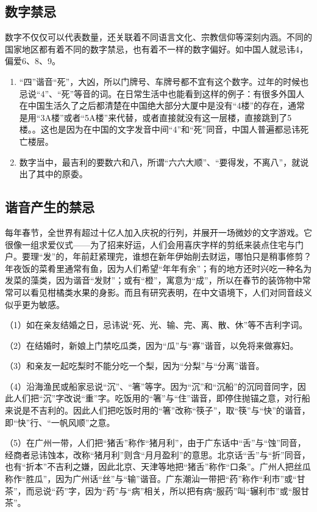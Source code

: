 \subsection{数字禁忌}

    数字不仅仅可以代表数量，还关联着不同语言文化、宗教信仰等深刻内涵。不同的国家地区都有着不同的数字禁忌，也有着不一样的数字偏好。如中国人就忌讳4，偏爱6、8、9。
    \begin{enumerate}
    \item 
    “四”谐音“死”，大凶，所以门牌号、车牌号都不宜有这个数字。过年的时候也忌说“4”、“死”等音的词。在日常生活中也能看到这样的例子：有很多外国人在中国生活久了之后都清楚在中国绝大部分大厦中是没有“4楼”的存在，通常是用“3A楼”或者“5A楼”来代替，或者直接就没有这一层楼，直接跳到了5楼。。这也是因为在中国的文字发音中间“4”和“死”同音，中国人普遍都忌讳死亡楼层。
    \item 
    数字当中，最吉利的要数六和八，所谓“六六大顺”、“要得发，不离八”，就说出了其中的原委。　　
        
    \end{enumerate}



\subsection{谐音产生的禁忌}

    每年春节，全世界有超过十亿人加入庆祝的行列，并展开一场微妙的文字游戏。它很像一组求爱仪式——为了招来好运，人们会用喜庆字样的剪纸来装点住宅与门户。要理“发”的，年前赶紧理完，谁想在新年伊始削去财运，哪怕只是稍事修剪？年夜饭的菜肴里通常有鱼，因为人们希望“年年有余”；有的地方还时兴吃一种名为发菜的藻类，因为谐音“发财”；或有“橙”，寓意为“成”，所以在春节的装饰物中常常可以看见柑橘类水果的身影。而且有研究表明，在中文语境下，人们对同音歧义似乎更为敏感。

   （1）如在亲友结婚之日，忌讳说“死、光、输、完、离、散、休”等不吉利字词。

   （2）在结婚时，新娘上门禁吃瓜类，因为“瓜”与“寡”谐音，以免将来做寡妇。

   （3）和亲友一起吃梨时不能分吃一个梨，因为“分梨”与“分离”谐音。

   （4）沿海渔民或船家忌说“沉”、“箸”等字。因为“沉”和“沉船”的沉同音同字，因此人们把“沉”字改说“重”字。吃饭用的“箸”与“住”谐音，即停住抛锚之意，对行船来说是不吉利的。因此人们把吃饭时用的“箸”改称“筷子”，取“筷”与“快”的谐音，即“快”行、“一帆风顺”之意。

   （5）在广州一带，人们把“猪舌”称作“猪月利”，由于广东话中“舌”与“蚀”同音，经商者忌讳蚀本，改称“猪月利”则含“月月盈利”的意思。北京话“舌”与“折”同音，也有“折本”不吉利之嫌，因此北京、天津等地把“猪舌”称作“口条”。广州人把丝瓜称作“胜瓜”，因为广州话“丝”与“输”谐音。广东潮汕一带把“药”称作“利市”或“甘茶”，而忌说“药”字，因为“药”与“病”相关，所以把有病“服药”叫“辗利市”或“服甘茶”。



